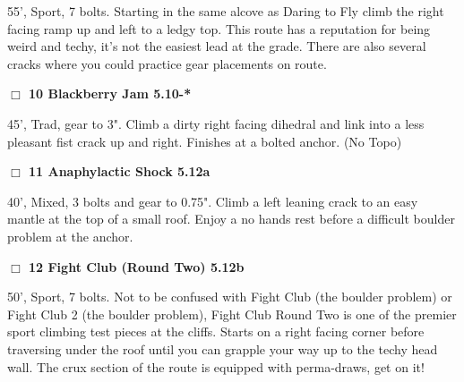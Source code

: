 \begin{multicols}{2}
\begin{adjustwidth}{1.3em}{}
55', Sport, 7 bolts. Starting in the same alcove as Daring to Fly climb the right facing ramp up and left to a ledgy top. This route has a reputation for being weird and techy, it's not the easiest lead at the grade. There are also several cracks where you could practice gear placements on route.
\end{adjustwidth}




\needspace{2em}
\label{rt:Blackberry Jam}
\colorbox{RoyalBlue!20}{
\parbox{0.95\linewidth}{
\hspace{-1ex}\textbf{$\Box$
10 Blackberry Jam 5.10-*  
}}}
\begin{adjustwidth}{1.3em}{}			

45', Trad, gear to 3". Climb a dirty right facing dihedral and link into a less pleasant fist crack up and right. Finishes at a bolted anchor.
  (No Topo)
\end{adjustwidth}




\needspace{2em}
\label{rt:Anaphylactic Shock}
\colorbox{Goldenrod!20}{
\parbox{0.95\linewidth}{
\hspace{-1ex}\textbf{$\Box$
11 Anaphylactic Shock 5.12a  
}}}
\begin{adjustwidth}{1.3em}{}			

40', Mixed, 3 bolts and gear to 0.75". Climb a left leaning crack to an easy mantle at the top of a small roof. Enjoy a no hands rest before a difficult boulder problem at the anchor.
\end{adjustwidth}




\needspace{2em}
\label{rt:Fight Club (Round Two)}
\colorbox{Goldenrod!20}{
\parbox{0.95\linewidth}{
\hspace{-1ex}\textbf{$\Box$
12 Fight Club (Round Two) 5.12b  
}}}
\begin{adjustwidth}{1.3em}{}			

50', Sport, 7 bolts. Not to be confused with Fight Club (the boulder problem) or Fight Club 2 (the boulder problem), Fight Club Round Two is one of the premier sport climbing test pieces at the cliffs. Starts on a right facing corner before traversing under the roof until you can grapple your way up to the techy head wall. The crux section of the route is equipped with perma-draws, get on it!
\end{adjustwidth}





\end{multicols}
